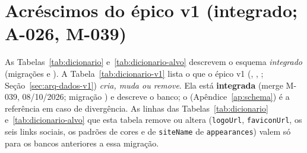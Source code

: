 \section*{Acréscimos do épico v1 (integrado; A-026, M-039)}

As Tabelas~\ref{tab:dicionario} e~\ref{tab:dicionario-alvo} descrevem o esquema \emph{integrado} (migrações  e ). A Tabela~\ref{tab:dicionario-v1} lista o que o épico v1 (, , ; Seção~\ref{sec:arq-dados-v1}) \emph{cria, muda ou remove}. Ela está \textbf{integrada} (merge M-039, 08/10/2026; migração ) e descreve o banco; o  (Apêndice~\ref{ap:schema}) é a referência em caso de divergência. As linhas das Tabelas~\ref{tab:dicionario} e~\ref{tab:dicionario-alvo} que esta tabela remove ou altera (\texttt{logoUrl}, \texttt{faviconUrl}, os seis links sociais, os padrões de cores e de \texttt{siteName} de \texttt{appearances}) valem só para os bancos anteriores a essa migração.

